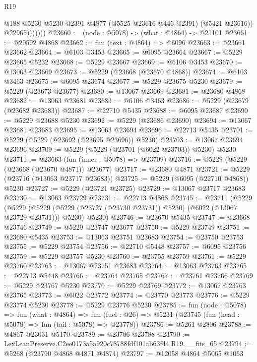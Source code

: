 \begin{lexlean}{R19}
\begin{coremodule}
                    @188
                    @5230
                    @5230
                    @2391
                    @4877
                    (@5525 @23616 @446 @2391)
                    (@5421 @23616))
                  @22965)))))))
@23660 := (node : @5078) -> (what : @4864) -> @21101
@23661 := @20592 @4868
@23662 := fun (text : @4864) => @6096
@23663 := @23661 @23662
@23664 := @6103 @3453
@23665 := @6095 @23664
@23667 := @5229 @23665 @5232
@23668 := @5229 @23667
@23669 := @6106 @3453
@23670 := @13063 @23669
@23673 := @5229 (@23668 (@23670 @4868))
@23674 := @6103 @3463
@23675 := @6095 @23674
@23677 := @5229 @23675 @5230
@23679 := @5229 (@23673 @23677)
@23680 := @13067 @23669
@23681 := @23680 @4868
@23682 := @13063 @23681
@23683 := @6106 @3463
@23686 := @5229 (@23679 (@23682 @23683))
@23687 := @22710 @5435
@23688 := @6095 @23687
@23690 := @5229 @23688 @5230
@23692 := @5229 (@23686 @23690)
@23694 := @13067 @23681 @23683
@23695 := @13063 @23694
@23696 := @22713 @5435
@23701 := @5229 (@5229 (@23692 (@23695 @23696)) @5230)
@23703 := @13067 @23694 @23696
@23709 := @5229 (@5229 (@23701 (@6022 @23703)) @5230) @5230
@23711 := @23663 (fun (inner : @5078) => @23709)
@23716 := @5229 (@5229 (@23668 (@23670 @4871)) @23677)
@23717 := @23680 @4871
@23721 := @5229 (@23716 (@13063 @23717 @23683))
@23725 := @5229 (@6095 (@22710 @4868)) @5230
@23727 := @5229 (@23721 @23725)
@23729 := @13067 @23717 @23683
@23730 := @13063 @23729
@23731 := @22713 @4868
@23745 := @23711
    (@5229
      (@5229 (@5229 (@5229 (@23727 (@23730 @23731)) @5230) (@6022 (@13067 @23729 @23731))) @5230)
      @5230)
@23746 := @23670 @5435
@23747 := @23668 @23746
@23749 := @5229 @23747 @23677
@23750 := @5229 @23749
@23751 := @23680 @5435
@23753 := @13063 @23751 @23683
@23754 := @23750 @23753
@23755 := @5229 @23754
@23756 := @22710 @5448
@23757 := @6095 @23756
@23759 := @5229 @23757 @5230
@23760 := @23755 @23759
@23761 := @5229 @23760
@23763 := @13067 @23751 @23683
@23764 := @13063 @23763
@23765 := @22713 @5448
@23766 := @23764 @23765
@23767 := @23761 @23766
@23769 := @5229 @23767 @5230
@23770 := @5229 @23769
@23772 := @13067 @23763 @23765
@23773 := @6022 @23772
@23774 := @23770 @23773
@23776 := @5229 @23774 @5230
@23778 := @5229 @23776 @5230
@23785 := fun (node : @5078) =>
  fun (what : @4864) =>
  fun (fuel : @26) => @5231 (@23745 (fun (head : @5078) => fun (tail : @5078) => @23778))
@23786 := @5261 @2806
@23788 := @4867 @23031 @5170
@23789 := @23786 @23788
@23790 := LexLeanPreserve.C2ee0173a5a920c78788fdf101ab63f44.R19.__fits_65
@23794 := @5268 (@23790 @4868 @4871 @4874)
@23797 := @12058 @4864 @5065 @1063

\end{coremodule}
\end{lexlean}
